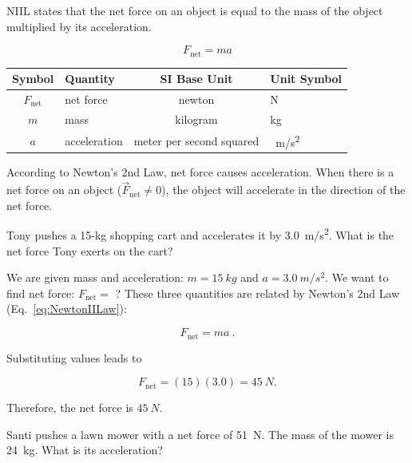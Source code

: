 \documentclass{article}
\numberwithin{equation}{section}
\numberwithin{figure}{section}
\begin{document}
\begin{mdframed}[backgroundcolor=black!10]
\gls{NIIL} states that the net force on an object is equal to the mass of the object multiplied by its acceleration.

\begin{equation} \label{eq:NewtonIILaw} 
    F_{\mathrm{net}} = ma
\end{equation}

\begin{center}
    \begin{tabular}{cl|cl}
    \hline
    \textbf{Symbol} & \textbf{Quantity} & \textbf{SI Base Unit} & \textbf{Unit Symbol}  \\
    \hline\hline
    \rule{0pt}{2.5ex}
        $F_{\mathrm{net}}$ & net force & newton & N\\
        $m$ & mass & kilogram & kg\\
        $a$ & acceleration & meter per second squared & \SI{}{m/s^2}\\
    \hline
    \end{tabular}
\end{center}

According to Newton's 2nd Law, net force causes acceleration. When there is a net force on an object ($\vec{F}_{\text{net}} \neq 0$), the object will accelerate in the direction of the net force.
\end{mdframed}


\begin{example} \label{ex:NetForce_Tony}
Tony pushes a 15-kg shopping cart and accelerates it by \SI{3.0}{m/s^2}. What is the net force Tony exerts on the cart?
\end{example}

\Solution We are given mass and acceleration: $m = \SI{15}{kg}$ and $a = \SI{3.0}{m/s^2}$. We want to find net force: $F_{\text{net}} =$ ? These three quantities are related by Newton's 2nd Law (Eq.~\ref{eq:NewtonIILaw}):

\begin{equation*}
    F_{\text{net}} = m a\ .
\end{equation*}

Substituting values leads to

\begin{equation*}
    F_{\text{net}} = (15)(3.0) = \SI{45}{N}.
\end{equation*}

Therefore, the net force is $\SI{45}{N}$. 

\begin{example} \label{ex:Solve_NIIL_a}
Santi pushes a lawn mower with a net force of \SI{51}{N}. The mass of the mower is \SI{24}{kg}. What is its acceleration?
\end{example}
\end{document}

